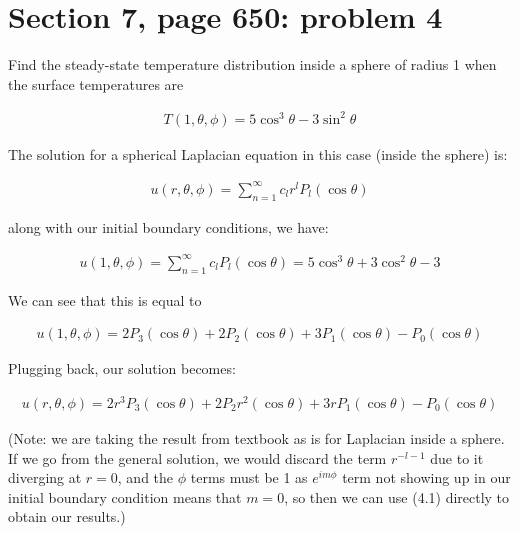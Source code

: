 \documentclass{article}
\numberwithin{equation}{section}
\begin{document}
\section{Section 7, page 650: problem 4}

Find the steady-state temperature distribution inside a sphere of radius 1 when the surface temperatures are

\begin{align*}
    T(1, \theta, \phi) = 5 \cos^3 \theta - 3 \sin^2 \theta
\end{align*}

The solution for a spherical Laplacian equation in this case (inside the sphere) is:

\begin{align}
    u(r, \theta, \phi) = \sum_{n=1}^{\infty} c_l r^l P_l(\cos \theta)
\end{align}

along with our initial boundary conditions, we have:

\begin{align}
    u(1, \theta, \phi) = \sum_{n=1}^{\infty} c_l P_l(\cos \theta) = 5 \cos^3 \theta + 3 \cos^2 \theta - 3
\end{align}

We can see that this is equal to

\begin{align}
    u(1, \theta, \phi) = 2 P_3(\cos\theta) + 2 P_2 (\cos \theta) + 3 P_1 (\cos\theta) -  P_0(\cos \theta)
\end{align}

Plugging back, our solution becomes:

\begin{align}
    u(r, \theta, \phi) = 2 r^3 P_3(\cos\theta) + 2 P_2 r^2 (\cos \theta) + 3 r P_1 (\cos\theta) -  P_0(\cos \theta)
\end{align}

(Note: we are taking the result from textbook as is for Laplacian inside a sphere. If we go from the general solution, we would discard the term $r^{-l-1}$ due to it diverging at $r = 0$, and the $\phi$ terms must be 1 as $e^{im\phi}$ term not showing up in our initial boundary condition means that $m = 0$, so then we can use (4.1) directly to obtain our results.)
\end{document}
